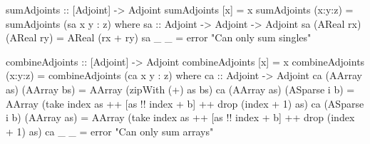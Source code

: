     \begin{haskell}[caption=Functions to combine adjoints, label=lst:combine, gobble=8]
        sumAdjoints :: [Adjoint] -> Adjoint
        sumAdjoints [x]     = x
        sumAdjoints (x:y:z) = sumAdjoints (sa x y : z)
            where
                sa :: Adjoint -> Adjoint -> Adjoint
                sa (AReal rx) (AReal ry) = AReal (rx + ry)
                sa _          _          = error "Can only sum singles"

        combineAdjoints :: [Adjoint] -> Adjoint
        combineAdjoints [x]     = x
        combineAdjoints (x:y:z) = combineAdjoints (ca x y : z)
            where
                ca :: Adjoint -> Adjoint
                ca (AArray as) (AArray bs)   = AArray (zipWith (+) as bs)
                ca (AArray as) (ASparse i b) = AArray
                    (take index as ++ [as !! index + b] ++ drop (index + 1) as)
                ca (ASparse i b) (AArray as) = AArray
                    (take index as ++ [as !! index + b] ++ drop (index + 1) as)
                ca _           _             = error "Can only sum arrays"
    \end{haskell}